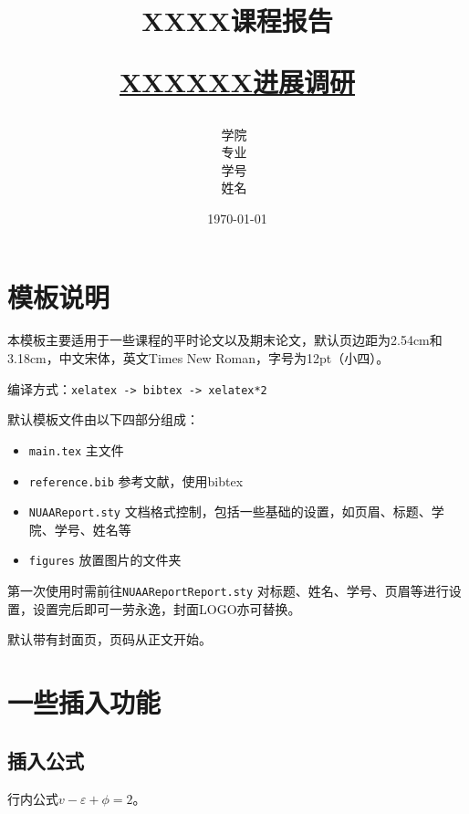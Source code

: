 \documentclass[12pt,hyperref,a4paper,UTF8,fontset=fandol]{ctexart}
\title{ 
        \vspace{1cm}
        \heiti \Huge \textbf{{XXXX课程报告}} \par
        \vspace{1cm} 
        \heiti \Large {\underline{XXXXXX进展调研}}    
        \vspace{3cm}
    }
\author{
        \vspace{0.5cm}
        \kaishu\Large 学院\ \dlmu[9cm]{计算机学院} \\ %
        \vspace{0.5cm}
        \kaishu\Large 专业\ \dlmu[9cm]{计算机科学与技术} \\ %
        \vspace{0.5cm}
        \kaishu\Large 学号\ \dlmu[9cm]{2025XXXXXX} \qquad  \\ %
        \vspace{0.5cm}
        \kaishu\Large 姓名\ \dlmu[9cm]{XXX} \qquad \\ %
    }
\date{\today} %
\begin{document}
\cover

%
%

\thispagestyle{empty} %


\newpage
\setcounter{page}{1} %


\section{模板说明}
本模板主要适用于一些课程的平时论文以及期末论文，默认页边距为2.54cm和3.18cm，中文宋体，英文Times New Roman，字号为12pt（小四）。

编译方式：\verb|xelatex -> bibtex -> xelatex*2|


默认模板文件由以下四部分组成：
\begin{itemize}
    \item \texttt{main.tex} 主文件
    \item \texttt{reference.bib} 参考文献，使用bibtex
    \item \texttt{NUAAReport.sty} 文档格式控制，包括一些基础的设置，如页眉、标题、学院、学号、姓名等
    \item \texttt{figures} 放置图片的文件夹
\end{itemize}

第一次使用时需前往\texttt{NUAAReportReport.sty} 对标题、姓名、学号、页眉等进行设置，设置完后即可一劳永逸，封面LOGO亦可替换。

默认带有封面页，页码从正文开始。

\section{一些插入功能}
\subsection{插入公式}
行内公式$v-\varepsilon+\phi=2$。
\end{document}
